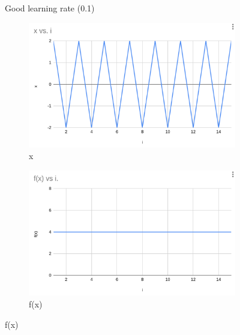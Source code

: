 \documentclass{article}
\begin{document}
\begin{figure}[H]
    \caption{Good learning rate (0.1)}
    \label{fig:good}
\end{figure}


\begin{figure}
    \centering
    \begin{subfigure}{0.3\linewidth}
        \centering
        \includegraphics[width=\linewidth]{x_l.png}
        \caption{x}
        \label{fig:enter-label}
    \end{subfigure}
    
    \begin{subfigure}{0.3\linewidth}
        \centering
        \includegraphics[width=\linewidth]{fx_l.png}
        \caption{f(x)}
        \label{fig:enter-label}
    \end{subfigure}
    

\end{figure}
\end{document}
